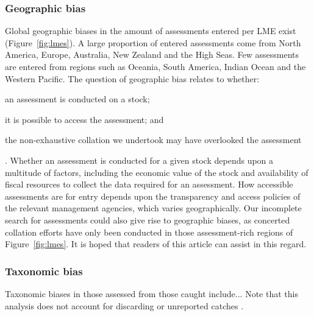 \documentclass[letterpaper,12pt]{article}
\begin{document}
\subsubsection{Geographic bias}
Global geographic biases in the amount of assessments entered per LME exist (Figure~\ref{fig:lmes}). A large proportion of entered assessments come from North America, Europe, Australia, New Zealand and the High Seas. Few assessments are entered from regions such as Oceania, South America, Indian Ocean and the Western Pacific. The question of geographic bias relates to whether: \begin{inparaenum}[1\upshape)] \item an assessment is conducted on a stock; \item it is possible to access the assessment; and \item the non-exhaustive collation we undertook may have overlooked the assessment \end{inparaenum}. Whether an assessment is conducted for a given stock depends upon a multitude of factors, including the economic value of the stock and availability of fiscal resources to collect the data required for an assessment. How accessible assessments are for entry depends upon the transparency and access policies of the relevant management agencies, which varies geographically. Our incomplete search for assessments could also give rise to geographic biases, as concerted collation efforts have only been conducted in those assessment-rich regions of Figure~\ref{fig:lmes}. It is hoped that readers of this article can assist in this regard.

\subsubsection{Taxonomic bias}
Taxonomic biases in those assessed from those caught include...
Note that this analysis does not account for discarding or unreported catches \citep{Pauly:etal:2002:nature, Pitcher:etal:2002:fnf}.
\end{document}

